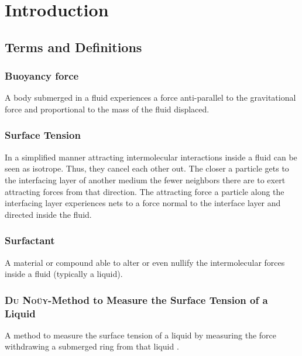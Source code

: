 \chapter{Introduction}
    \section{Terms and Definitions}
        \subsection*{Buoyancy force}\label{sec:Buoyancy force}
            A body submerged in a fluid experiences a force anti-parallel to the gravitational force and proportional to the
            mass of the fluid displaced.
        \subsection*{Surface Tension}
            In a simplified manner attracting intermolecular interactions inside a fluid can be seen as isotrope. Thus,
            they cancel each other out. The closer a particle gets to the interfacing layer of another medium the fewer neighbors
            there are to exert attracting forces from that direction. The attracting force a particle along the interfacing
            layer experiences nets to a force normal to the interface layer and directed inside the fluid.
        \subsection*{Surfactant}
            A material or compound able to alter or even nullify the intermolecular forces inside a fluid (typically a liquid).
        \subsection*{\textsc{Du Noüy}-Method to Measure the Surface Tension of a Liquid}
            A method to measure the surface tension of a liquid by measuring the force withdrawing a submerged ring from that
            liquid \cite{DuNouy.1919.early.ring.method}.
